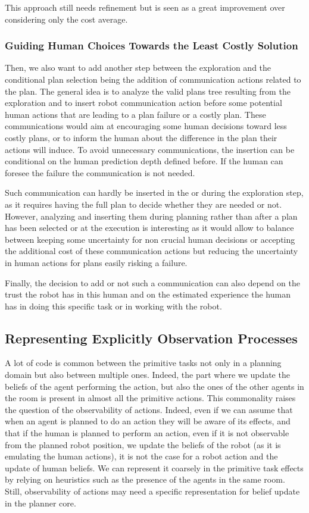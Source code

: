 \documentclass[a4paper,11pt,twoside]{StyleThese}
\begin{document}
This approach still needs refinement but is seen as a great improvement over considering only the cost average.

\subsubsection{Guiding Human Choices Towards the Least Costly Solution}
Then, we also want to add another step between the  exploration and the conditional plan selection being the addition of communication actions related to the plan. The general idea is to analyze the valid plans tree resulting from the  exploration and to insert robot communication action before some potential human actions that are leading to a plan failure or a costly plan. These communications would aim at encouraging some human decisions toward less costly plans, or to inform the human about the difference in the plan their actions will induce. To avoid unnecessary communications, the insertion can be conditional on the human prediction depth defined before. If the human can foresee the failure the communication is not needed.

Such communication can hardly be inserted in the  or during the  exploration step, as it requires having the full plan to decide whether they are needed or not. However, analyzing and inserting them during planning rather than after a plan has been selected or at the execution is interesting as it would allow to balance between keeping some uncertainty for non crucial human decisions or accepting the additional cost of these communication actions but reducing the uncertainty in human actions for plans easily risking a failure.

Finally, the decision to add or not such a communication can also depend on the trust the robot has in this human and on the estimated experience the human has in doing this specific task or in working with the robot.

\subsection{Representing Explicitly Observation Processes}
A lot of code is common between the primitive tasks not only in a planning domain but also between multiple ones. Indeed, the part where we update the beliefs of the agent performing the action, but also the ones of the other agents in the room is present in almost all the primitive actions. This commonality raises the question of the observability of actions. Indeed, even if we can assume that when an agent is planned to do an action they will be aware of its effects, and that if the human is planned to perform an action, even if it is not observable from the planned robot position, we update the beliefs of the robot (as it is emulating the human actions), it is not the case for a robot action and the update of human beliefs. We can represent it coarsely in the primitive task effects by relying on heuristics such as the presence of the agents in the same room. Still, observability of actions may need a specific representation for belief update in the planner core.
\end{document}
